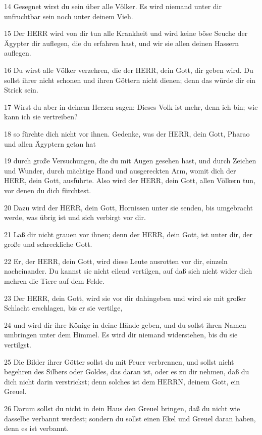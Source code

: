 \par 14 Gesegnet wirst du sein über alle Völker. Es wird niemand unter dir unfruchtbar sein noch unter deinem Vieh.
\par 15 Der HERR wird von dir tun alle Krankheit und wird keine böse Seuche der Ägypter dir auflegen, die du erfahren hast, und wir sie allen deinen Hassern auflegen.
\par 16 Du wirst alle Völker verzehren, die der HERR, dein Gott, dir geben wird. Du sollst ihrer nicht schonen und ihren Göttern nicht dienen; denn das würde dir ein Strick sein.
\par 17 Wirst du aber in deinem Herzen sagen: Dieses Volk ist mehr, denn ich bin; wie kann ich sie vertreiben?
\par 18 so fürchte dich nicht vor ihnen. Gedenke, was der HERR, dein Gott, Pharao und allen Ägyptern getan hat
\par 19 durch große Versuchungen, die du mit Augen gesehen hast, und durch Zeichen und Wunder, durch mächtige Hand und ausgereckten Arm, womit dich der HERR, dein Gott, ausführte. Also wird der HERR, dein Gott, allen Völkern tun, vor denen du dich fürchtest.
\par 20 Dazu wird der HERR, dein Gott, Hornissen unter sie senden, bis umgebracht werde, was übrig ist und sich verbirgt vor dir.
\par 21 Laß dir nicht grauen vor ihnen; denn der HERR, dein Gott, ist unter dir, der große und schreckliche Gott.
\par 22 Er, der HERR, dein Gott, wird diese Leute ausrotten vor dir, einzeln nacheinander. Du kannst sie nicht eilend vertilgen, auf daß sich nicht wider dich mehren die Tiere auf dem Felde.
\par 23 Der HERR, dein Gott, wird sie vor dir dahingeben und wird sie mit großer Schlacht erschlagen, bis er sie vertilge,
\par 24 und wird dir ihre Könige in deine Hände geben, und du sollst ihren Namen umbringen unter dem Himmel. Es wird dir niemand widerstehen, bis du sie vertilgst.
\par 25 Die Bilder ihrer Götter sollst du mit Feuer verbrennen, und sollst nicht begehren des Silbers oder Goldes, das daran ist, oder es zu dir nehmen, daß du dich nicht darin verstrickst; denn solches ist dem HERRN, deinem Gott, ein Greuel.
\par 26 Darum sollst du nicht in dein Haus den Greuel bringen, daß du nicht wie dasselbe verbannt werdest; sondern du sollst einen Ekel und Greuel daran haben, denn es ist verbannt.


